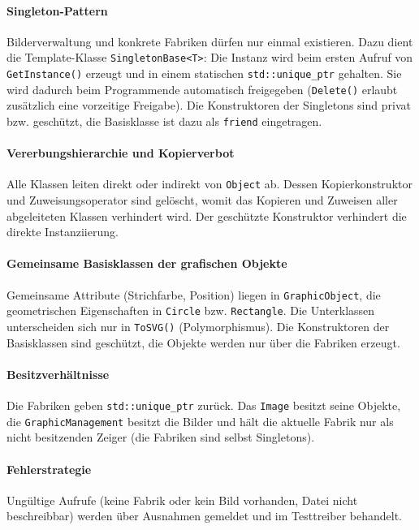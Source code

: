 \documentclass[a4paper,12pt]{article}
\begin{document}
\paragraph{Singleton-Pattern}
Bilderverwaltung und konkrete Fabriken dürfen nur einmal existieren. Dazu dient die Template-Klasse \texttt{SingletonBase<T>}: Die Instanz wird beim ersten Aufruf von \texttt{GetInstance()} erzeugt und in einem statischen \texttt{std::unique\_ptr} gehalten. Sie wird dadurch beim Programmende automatisch freigegeben (\texttt{Delete()} erlaubt zusätzlich eine vorzeitige Freigabe). Die Konstruktoren der Singletons sind privat bzw. geschützt, die Basisklasse ist dazu als \texttt{friend} eingetragen.

\paragraph{Vererbungshierarchie und Kopierverbot}
Alle Klassen leiten direkt oder indirekt von \texttt{Object} ab. Dessen Kopierkonstruktor und Zuweisungsoperator sind gelöscht, womit das Kopieren und Zuweisen aller abgeleiteten Klassen verhindert wird. Der geschützte Konstruktor verhindert die direkte Instanziierung.

\paragraph{Gemeinsame Basisklassen der grafischen Objekte}
Gemeinsame Attribute (Strichfarbe, Position) liegen in \texttt{GraphicObject}, die geometrischen Eigenschaften in \texttt{Circle} bzw. \texttt{Rectangle}. Die Unterklassen unterscheiden sich nur in \texttt{ToSVG()} (Polymorphismus). Die Konstruktoren der Basisklassen sind geschützt, die Objekte werden nur über die Fabriken erzeugt.

\paragraph{Besitzverhältnisse}
Die Fabriken geben \texttt{std::unique\_ptr} zurück. Das \texttt{Image} besitzt seine Objekte, die \texttt{GraphicManagement} besitzt die Bilder und hält die aktuelle Fabrik nur als nicht besitzenden Zeiger (die Fabriken sind selbst Singletons).

\paragraph{Fehlerstrategie}
Ungültige Aufrufe (keine Fabrik oder kein Bild vorhanden, Datei nicht
beschreibbar) werden über Ausnahmen gemeldet und im Testtreiber behandelt.
\end{document}
